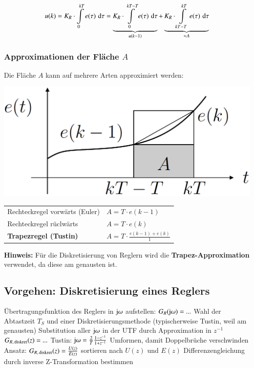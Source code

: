 $$ u(k) = K_R \cdot \int\limits_0^{kT} e(\tau) \, \mathop{} \! \mathrm{d} \tau
    = \underbrace{K_R \cdot \int\limits_0^{kT- T} e(\tau) \, \mathop{} \! \mathrm{d} \tau}_{u(k-1)} 
    + \underbrace{K_R \cdot \int\limits_{kT-T}^{kT} e(\tau) \, \mathop{} \! \mathrm{d} \tau}_{\approx A} $$


\subsubsection{Approximationen der Fläche $A$}

Die Fläche $A$ kann auf mehrere Arten approximiert werden:


\begin{minipage}[c]{0.3\columnwidth}
    \includegraphics[width=\columnwidth]{images/approximation_integration.png}
\end{minipage}
\hfill
\begin{minipage}[c]{0.68\columnwidth}
    \begin{tabular}{ll}
        Rechteckregel vorwärts (Euler)      & $ A = T \cdot e(k-1) $    \\
        Rechteckregel rüclwärts             & $ A = T \cdot e(k)$       \\
        \textbf{Trapezregel (Tustin)}       & $ A = T \cdot \frac{e(k-1) + e(k)}{1} $ 
    \end{tabular}
\end{minipage}

\vspace{0.2cm}
\textbf{Hinweis:} Für die Diskretisierung von Reglern wird die \textbf{Trapez-Approximation} verwendet, da diese am genausten ist.


\subsection{Vorgehen: Diskretisierung eines Reglers}

\begin{outline}
    \1 Übertragungsfunktion des Reglers in $\mathrm{j} \omega$ aufstellen: $G_R(\mathrm{j} \omega) = ...$
    \1 Wahl der Abtastzeit $T_S$ und einer Diskretisierungsmethode
        \2 (typischerweise Tustin, weil am genausten)
    \1 Substitution aller $\mathrm{j} \omega$ in der UTF durch Approximation in $z^{-1}$ \textrightarrow\ $G_{R, \, \rm diskret}(z) = ...$
        \2 Tustin: $\mathrm{j} \omega = \frac{2}{T} \frac{1 - z^{-1}}{1 + z^{-1}}$
    \1 Umformen, damit Doppelbrüche verschwinden
    \1 Ansatz: $G_{R, \, \rm diskret}(z) = \frac{U(z)}{E(z)}$ sortieren nach $U(z)$ und $E(z)$
    \1 Differenzengleichung durch inverse Z-Transformation bestimmen
\end{outline}


